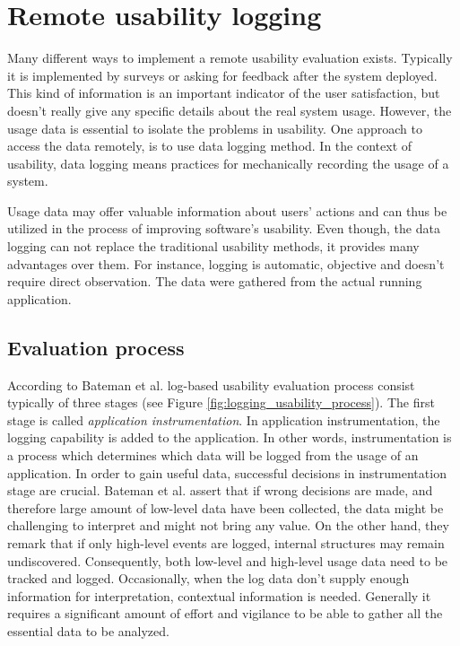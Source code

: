 \documentclass[12pt,a4paper,oneside,pdftex]{report}
\begin{document}
\section{Remote usability logging}
\label{sec:rue}

Many different ways to implement a remote usability evaluation exists. Typically it is implemented by surveys or asking for feedback after the system deployed. This kind of information is an important indicator of the user satisfaction, but doesn't really give any specific details about the real system usage. However, the usage data is essential to isolate the problems in usability. One approach to access the data remotely, is to use data logging method. In the context of usability, data logging means practices for mechanically recording the usage of a system. \cite{RefWorks:31}

Usage data may offer valuable information about users' actions and can thus be utilized in the process of improving software's usability. Even though, the data logging can not replace the traditional usability methods, it provides many advantages over them. For instance, logging is automatic, objective and doesn't require direct observation. The data were gathered from the actual running application. \cite{RefWorks:24}	


\subsection{Evaluation process} 

According to Bateman et al. \cite{RefWorks:24} log-based usability evaluation process consist typically of three stages (see Figure \ref{fig:logging_usability_process}). The first stage is called \emph{application instrumentation}. In application instrumentation, the logging capability is added to the application. In other words, instrumentation is a process which determines which data will be logged from the usage of an application. In order to gain useful data, successful decisions in instrumentation stage are crucial. Bateman et al. assert that if wrong decisions are made, and therefore large amount of low-level data have been collected, the data might be challenging to interpret and might not bring any value. On the other hand, they remark that if only high-level events are logged, internal structures may remain undiscovered. Consequently, both low-level and high-level usage data need to be tracked and logged. Occasionally, when the log data don't supply enough information for interpretation, contextual information is needed. Generally it requires a significant amount of effort and vigilance to be able to gather all the essential data to be analyzed. \cite{RefWorks:24}
\end{document}
